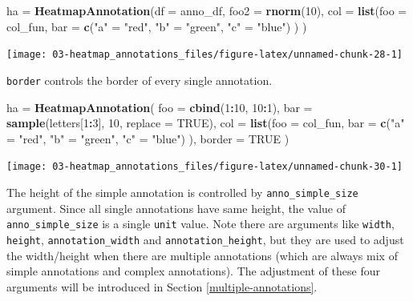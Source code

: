 \documentclass[]{book}
\newenvironment{Shaded}{\begin{snugshade}}{\end{snugshade}}
\newcommand{\KeywordTok}[1]{\textcolor[rgb]{0.13,0.29,0.53}{\textbf{#1}}}
\newcommand{\DataTypeTok}[1]{\textcolor[rgb]{0.13,0.29,0.53}{#1}}
\newcommand{\DecValTok}[1]{\textcolor[rgb]{0.00,0.00,0.81}{#1}}
\newcommand{\StringTok}[1]{\textcolor[rgb]{0.31,0.60,0.02}{#1}}
\newcommand{\OtherTok}[1]{\textcolor[rgb]{0.56,0.35,0.01}{#1}}
\newcommand{\OperatorTok}[1]{\textcolor[rgb]{0.81,0.36,0.00}{\textbf{#1}}}
\newcommand{\NormalTok}[1]{#1}
\theoremstyle{definition}
\theoremstyle{definition}
\theoremstyle{definition}
\theoremstyle{remark}
\begin{document}
\begin{Shaded}
\begin{Highlighting}[]
\NormalTok{ha =}\StringTok{ }\KeywordTok{HeatmapAnnotation}\NormalTok{(}\DataTypeTok{df =}\NormalTok{ anno_df,}
    \DataTypeTok{foo2 =} \KeywordTok{rnorm}\NormalTok{(}\DecValTok{10}\NormalTok{),}
    \DataTypeTok{col =} \KeywordTok{list}\NormalTok{(}\DataTypeTok{foo =}\NormalTok{ col_fun,}
               \DataTypeTok{bar =} \KeywordTok{c}\NormalTok{(}\StringTok{"a"}\NormalTok{ =}\StringTok{ "red"}\NormalTok{, }\StringTok{"b"}\NormalTok{ =}\StringTok{ "green"}\NormalTok{, }\StringTok{"c"}\NormalTok{ =}\StringTok{ "blue"}\NormalTok{)}
\NormalTok{    )}
\NormalTok{)}
\end{Highlighting}
\end{Shaded}

\begin{center}\texttt{[image: 03-heatmap\_annotations\_files/figure-latex/unnamed-chunk-28-1]} \end{center}

\texttt{border} controls the border of every single annotation.

\begin{Shaded}
\begin{Highlighting}[]
\NormalTok{ha =}\StringTok{ }\KeywordTok{HeatmapAnnotation}\NormalTok{(}
    \DataTypeTok{foo =} \KeywordTok{cbind}\NormalTok{(}\DecValTok{1}\OperatorTok{:}\DecValTok{10}\NormalTok{, }\DecValTok{10}\OperatorTok{:}\DecValTok{1}\NormalTok{),}
    \DataTypeTok{bar =} \KeywordTok{sample}\NormalTok{(letters[}\DecValTok{1}\OperatorTok{:}\DecValTok{3}\NormalTok{], }\DecValTok{10}\NormalTok{, }\DataTypeTok{replace =} \OtherTok{TRUE}\NormalTok{),}
    \DataTypeTok{col =} \KeywordTok{list}\NormalTok{(}\DataTypeTok{foo =}\NormalTok{ col_fun,}
               \DataTypeTok{bar =} \KeywordTok{c}\NormalTok{(}\StringTok{"a"}\NormalTok{ =}\StringTok{ "red"}\NormalTok{, }\StringTok{"b"}\NormalTok{ =}\StringTok{ "green"}\NormalTok{, }\StringTok{"c"}\NormalTok{ =}\StringTok{ "blue"}\NormalTok{)}
\NormalTok{    ),}
    \DataTypeTok{border =} \OtherTok{TRUE}
\NormalTok{)}
\end{Highlighting}
\end{Shaded}

\begin{center}\texttt{[image: 03-heatmap\_annotations\_files/figure-latex/unnamed-chunk-30-1]} \end{center}

The height of the simple annotation is controlled by
\texttt{anno\_simple\_size} argument. Since all single annotations have
same height, the value of \texttt{anno\_simple\_size} is a single
\texttt{unit} value. Note there are arguments like \texttt{width},
\texttt{height}, \texttt{annotation\_width} and
\texttt{annotation\_height}, but they are used to adjust the
width/height when there are multiple annotations (which are always mix
of simple annotations and complex annotations). The adjustment of these
four arguments will be introduced in Section \ref{multiple-annotations}.
\end{document}
